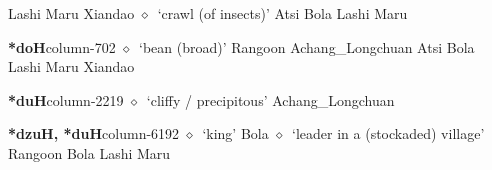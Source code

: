 \hspace{1ex}
         Lashi 
\hspace{1ex}
         Maru 
\hspace{1ex}
         Xiandao 
\hspace{1ex}
         $\diamond$~`crawl (of insects)'
         Atsi 
\hspace{1ex}
         Bola 
\hspace{1ex}
         Lashi 
\hspace{1ex}
         Maru 
  \item {\footnotesize \textbf{*doH}}{\tiny column-702}
         $\diamond$~`bean (broad)'
         Rangoon 
\hspace{1ex}
         Achang\_Longchuan 
\hspace{1ex}
         Atsi 
\hspace{1ex}
         Bola 
\hspace{1ex}
         Lashi 
\hspace{1ex}
         Maru 
\hspace{1ex}
         Xiandao 
  \item {\footnotesize \textbf{*duH}}{\tiny column-2219}
         $\diamond$~`cliffy / precipitous'
         Achang\_Longchuan 
  \item {\footnotesize \textbf{*dzuH, *duH}}{\tiny column-6192}
         $\diamond$~`king'
         Bola 
\hspace{1ex}
         $\diamond$~`leader in a (stockaded) village'
         Rangoon 
\hspace{1ex}
         Bola 
\hspace{1ex}
         Lashi 
\hspace{1ex}
         Maru 
\hspace{1ex}
